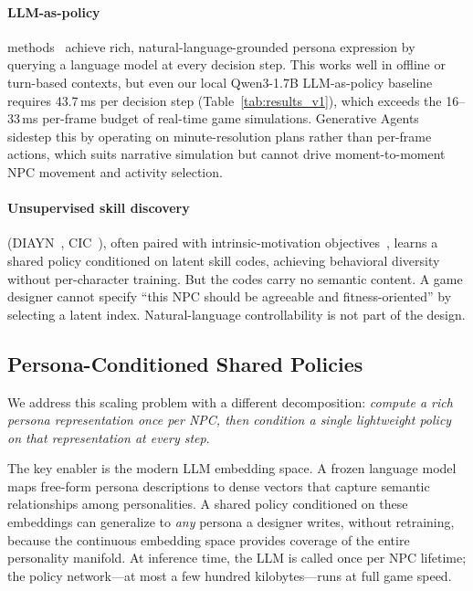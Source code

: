 \documentclass[conference]{IEEEtran}
\begin{document}
\paragraph{LLM-as-policy} methods~\cite{park2023generative,wang2023voyager,yao2023react,shinn2023reflexion,wei2022chain}
achieve rich, natural-language-grounded persona expression by querying a language
model at every decision step. This works well in offline or turn-based contexts,
but even our local Qwen3-1.7B LLM-as-policy baseline requires 43.7\,ms per
decision step (Table~\ref{tab:results_v1}),
which exceeds the 16--33\,ms per-frame budget of real-time game simulations.
Generative Agents~\cite{park2023generative} sidestep this by operating on
minute-resolution plans rather than per-frame actions, which suits narrative
simulation but cannot drive moment-to-moment NPC movement and activity selection.

\paragraph{Unsupervised skill discovery} (DIAYN~\cite{eysenbach2018diayn},
CIC~\cite{laskin2022cic}), often paired with intrinsic-motivation
objectives~\cite{pathak2017curiosity}, learns a shared policy conditioned on latent skill codes,
achieving behavioral diversity without per-character training. But the codes carry
no semantic content. A game designer cannot specify ``this NPC should be agreeable
and fitness-oriented'' by selecting a latent index.
Natural-language controllability is not part of the design.

\subsection{Persona-Conditioned Shared Policies}

We address this scaling problem with a different decomposition: \emph{compute a
rich persona representation once per NPC, then condition a single lightweight
policy on that representation at every step}.

The key enabler is the modern LLM embedding space. A frozen language model maps
free-form persona descriptions to dense vectors that capture semantic
relationships among personalities. A shared policy conditioned on these
embeddings can generalize to \emph{any} persona a designer writes, without
retraining, because the continuous embedding space provides coverage of the
entire personality manifold. At inference time, the LLM is called once per NPC
lifetime; the policy network---at most a few hundred kilobytes---runs at full
game speed.
\end{document}
